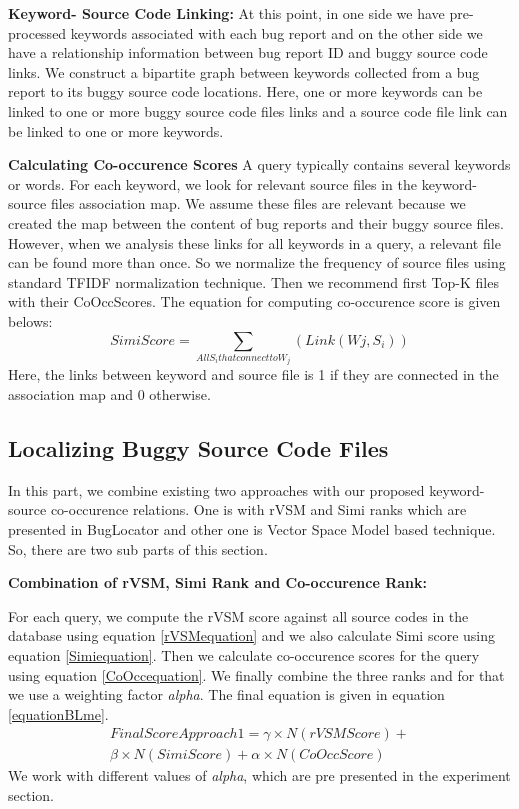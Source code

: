 \documentclass[conference]{IEEEtran}
\begin{document}
\textbf{Keyword- Source Code Linking:}
At this point, in one side we have pre-processed keywords associated with each bug report and on the other side we have a relationship information between bug report ID and buggy source code links. We construct a bipartite graph between keywords collected from a bug report to its buggy source code locations. Here, one or more keywords can be linked to one or more buggy source code files links and a source code file link can be linked to one or more keywords.

\textbf{Calculating Co-occurence Scores}
A query typically contains several keywords or words. For each keyword, we look for relevant source files in the keyword-source files association map. We assume these files are relevant because we created the map between the content of bug reports and their buggy source files. However, when we analysis these links for all keywords in a query, a relevant file can be found more than once. So we normalize the frequency of source files using standard TFIDF normalization technique. Then we recommend first Top-K files with their CoOccScores. The equation for computing co-occurence score is given belows:
\begin{equation}\label{CoOccequation}
SimiScore=\sum_{All S_{i} that connect to W_{j}}(Link(W{j},S_{i}))
\end{equation}
Here, the links between keyword and source file is 1 if they are connected in the association map and 0 otherwise.


\subsection{Localizing Buggy Source Code Files} 
In this part, we combine existing two approaches with our proposed keyword-source co-occurence relations. One is with rVSM and Simi ranks which are presented in BugLocator and other one is Vector Space Model based technique. So, there are two sub parts of this section.

\textbf{Combination of rVSM, Simi Rank and Co-occurence Rank:}

For each query, we compute the rVSM score against all source codes in the database using equation \ref{rVSMequation} and we also calculate Simi score using equation \ref{Simiequation}. Then we calculate co-occurence scores for the query using equation \ref{CoOccequation}.
We finally combine the three ranks and for that we use a weighting factor \textit{alpha}.
The final equation is given in equation \ref{equationBLme}.
\begin{multline}\label{equationBLme}
FinalScoreApproach1=\gamma \times N(rVSMScore)+
\\ \beta \times N(SimiScore) + \alpha \times N(CoOccScore)
\end{multline}
We work with different values of \textit{alpha}, which are pre presented in the experiment section.
\end{document}
